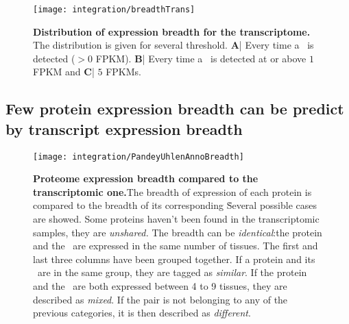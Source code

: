 \begin{figure}[!htbp]
    \texttt{[image: integration/breadthTrans]}\centering
    \caption[Distribution of expression breadth for the transcriptome]
    {\label{fig:breadthTrans}\textbf{Distribution of expression breadth for the
    transcriptome.} The distribution is given for several threshold.
    \textbf{A}| Every time a \mRNA\ is detected ($> 0$ \gls{FPKM}).
    \textbf{B}| Every time a \mRNA\ is detected at or above $1$ \gls{FPKM} and
    \textbf{C}| $5$ \glspl{FPKM}.}
\end{figure}

\subsection{Few protein expression breadth can be predict by transcript
expression breadth}

\begin{figure}[!htbp]
\texttt{[image: integration/PandeyUhlenAnnoBreadth]}\centering
    \caption[Proteome expression breadth compared to the transcriptomic one]{\label{fig:breadthColPandeyUhlen}\textbf{Proteome expression breadth
    compared to the transcriptomic one.}The breadth of expression of each protein
    is compared to the breadth of its corresponding \mRNA\. Several possible cases
    are showed. Some proteins haven't been found in the transcriptomic samples,
    they are \emph{unshared.}
    The breadth can be \emph{identical}:the protein and the \mRNA\ are
    expressed in the same number of tissues. The first and last three columns
    have been grouped together. If a protein and its \mRNA\ are in the same group,
    they are tagged as \emph{similar}. If the protein and the \mRNA\ are both
    expressed between 4 to 9 tissues, they are described as \emph{mixed}. If the
    pair is not belonging to any of the previous categories, it is then described
    as \emph{different}.}
\end{figure}


